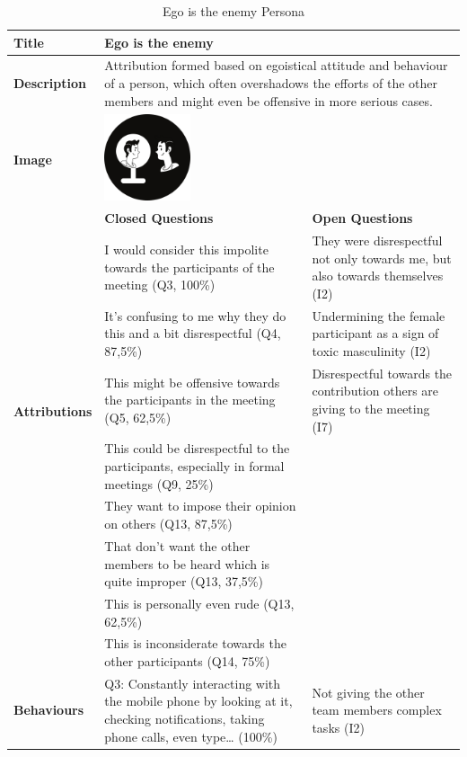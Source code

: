 \begin{longtable}[ht]{ p{}  p{} p{} }
\caption{Ego is the enemy Persona}
\label{tab:theEgo}\\
\hline
\textbf{Title} & Ego is the enemy \\
    \hline
   \textbf{Description} & \multicolumn{2}{p{.80\textwidth}}{Attribution formed based on egoistical attitude and behaviour of a person, which often overshadows the efforts of the other members and might even be offensive in more serious cases.}  \\
   \hline
   \textbf{Image} &  \includegraphics[valign=t, width=1in, margin=0pt 3pt 0pt 3pt]{figures/Ego.png} \\
    \hline
    & \textbf{Closed Questions} & \textbf{Open Questions} \\
    \hline
    \multirow{6}{3cm}{\textbf{Attributions}}  & I would consider this impolite towards the participants of the meeting (Q3, 100\%) & They were disrespectful not only towards me, but also towards themselves (I2) \\
     & It’s confusing to me why they do this and a bit disrespectful (Q4, 87,5\%)&  Undermining the female participant as a sign of toxic masculinity (I2) \\
     & This might be offensive towards the participants in the meeting (Q5, 62,5\%) & Disrespectful towards the contribution others are giving to the meeting (I7) \\
     & This could be disrespectful to the participants, especially in formal meetings (Q9, 25\%)  \\
 	 & They want to impose their opinion on others (Q13, 87,5\%)   \\
 	 & That don't want the other members to be heard which is quite improper (Q13, 37,5\%)\\
 	 & This is personally even rude (Q13, 62,5\%) \\
 	 & This is inconsiderate towards the other participants (Q14, 75\%) \\
    \hline
    \multirow{5}{3cm}{\textbf{Behaviours}}  & Q3: Constantly interacting with the mobile phone by looking at it, checking notifications, taking phone calls, even type… (100\%) & Not giving the other team members complex tasks (I2) \\

\end{longtable}
